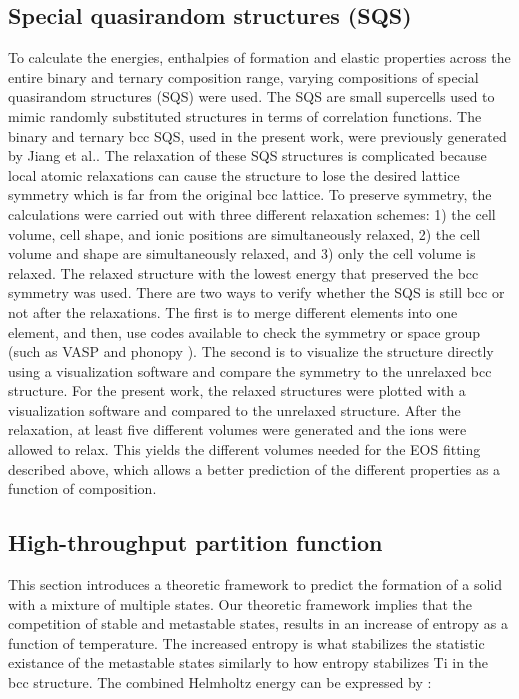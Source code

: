 \subsection{Special quasirandom structures (SQS)}

To calculate the energies, enthalpies of formation and elastic properties across the entire binary and ternary composition range, varying compositions of special quasirandom structures (SQS) were used. The SQS are small supercells used to mimic randomly substituted structures in terms of correlation functions. The binary and ternary bcc SQS, used in the present work, were previously generated by Jiang et al.\cite{Jiang2004,Jiang2009}. The relaxation of these SQS structures is complicated because local atomic relaxations can cause the structure to lose the desired lattice symmetry which is far from the original bcc lattice. To preserve symmetry, the calculations were carried out with three different relaxation schemes: 1) the cell volume, cell shape, and ionic positions are simultaneously relaxed, 2) the cell volume and shape are simultaneously relaxed, and 3) only the cell volume is relaxed. The relaxed structure with the lowest energy that preserved the bcc symmetry was used. There are two ways to verify whether the SQS is still bcc or not after the relaxations. The first is to merge different elements into one element, and then, use codes available to check the symmetry or space group (such as VASP \cite{Kresse1999} and phonopy \cite{Togo2008}). The second is to visualize the structure directly using a visualization software and compare the symmetry to the unrelaxed bcc structure. For the present work, the relaxed structures were plotted with a visualization software and compared to the unrelaxed structure. After the relaxation, at least five different volumes were generated and the ions were allowed to relax. This yields the different volumes needed for the EOS fitting described above, which allows a better prediction of the different properties as a function of composition. 

\subsection{High-throughput partition function}

This section introduces a theoretic framework to predict the formation of a solid with a mixture of multiple states. Our theoretic framework implies that the competition of stable and metastable states, results in an increase of entropy as a function of temperature. The increased entropy is what stabilizes the statistic existance of the metastable states similarly to how entropy stabilizes Ti in the bcc structure. The combined Helmholtz energy can be expressed by \cite{Liu2016}:


